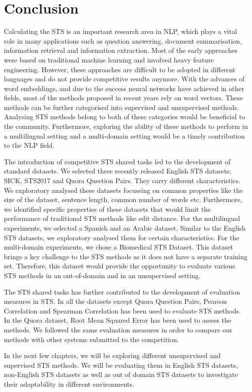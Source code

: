 \section{Conclusion}
Calculating the STS is an important research area in NLP, which plays a vital role in many applications such as question answering, document summarisation, information retrieval and information extraction. Most of the early approaches were based on traditional machine learning and involved heavy feature engineering. However, these approaches are difficult to be adopted in different languages and do not provide competitive results anymore. With the advances of word embeddings, and due to the success neural networks have achieved in other fields, most of the methods proposed in recent years rely on word vectors. These methods can be further categorised into supervised and unsupervised methods. Analysing STS methods belong to both of these categories would be beneficial to the community. Furthermore, exploring the ability of these methods to perform in a multilingual setting and a multi-domain setting would be a timely contribution to the NLP field. 

The introduction of competitive STS shared tasks led to the development of standard datasets. We selected three recently released English STS datasets; SICK, STS2017 and Quora Question Pairs. They carry different characteristics. We exploratory analysed these datasets focussing on common properties like the size of the dataset, sentence length, common number of words etc. Furthermore, we identified specific properties of these datasets that would limit the performance of traditional STS methods like edit distance. For the multilingual experiments, we selected a Spanish and an Arabic dataset. Similar to the English STS datasets, we exploratory analysed them for certain characteristics. For the multi-domain experiments, we chose a Biomedical STS Dataset. This dataset brings a key challenge to the STS methods as it does not have a separate training set. Therefore, this dataset would provide the opportunity to evaluate various STS methods in an out-of-domain and in an unsupervised setting.

The STS shared tasks has further contributed to the development of evaluation measures in STS. In all the datasets except Quora Question Pairs, Pearson Correlation and Spearman Correlation has been used to evaluate STS methods. In the Quora dataset, Root Mean Squared Error has been used to assess the methods. We followed the same evaluation measures in order to compare our methods with other systems submitted to the competition. 

In the next few chapters, we will be exploring different unsupervised and supervised STS methods. We will be evaluating them in English STS datasets, non-English STS datasets as well as out of domain STS datasets to investigate their adaptability in different environments.

   


